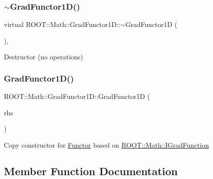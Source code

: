 \subsubsection{\texorpdfstring{$\sim$GradFunctor1D()}{~GradFunctor1D()}\hspace{0.1cm}{\footnotesize\ttfamily [2/2]}}
{\footnotesize\ttfamily virtual R\+O\+O\+T\+::\+Math\+::\+Grad\+Functor1\+D\+::$\sim$\+Grad\+Functor1D (\begin{DoxyParamCaption}{ }\end{DoxyParamCaption})\hspace{0.3cm}{\ttfamily [inline]}, {\ttfamily [virtual]}}

Destructor (no operations) \mbox{\label{classROOT_1_1Math_1_1GradFunctor1D_af43388b384674d1e811cfbc1ad562816}} 
\subsubsection{\texorpdfstring{GradFunctor1D()}{GradFunctor1D()}\hspace{0.1cm}{\footnotesize\ttfamily [10/10]}}
{\footnotesize\ttfamily R\+O\+O\+T\+::\+Math\+::\+Grad\+Functor1\+D\+::\+Grad\+Functor1D (\begin{DoxyParamCaption}\item[{const \mbox{\hyperlink{classROOT_1_1Math_1_1GradFunctor1D}{Grad\+Functor1D}} \&}]{rhs }\end{DoxyParamCaption})\hspace{0.3cm}{\ttfamily [inline]}}

Copy constructor for \mbox{\hyperlink{classROOT_1_1Math_1_1Functor}{Functor}} based on \mbox{\hyperlink{namespaceROOT_1_1Math_a2ff34b4dac0c7103abd9f3053e4666af}{R\+O\+O\+T\+::\+Math\+::\+I\+Grad\+Function}} 

\subsection{Member Function Documentation}
\mbox{\label{classROOT_1_1Math_1_1GradFunctor1D_ab8280aaf240a374fb7a67808d858af79}} 
